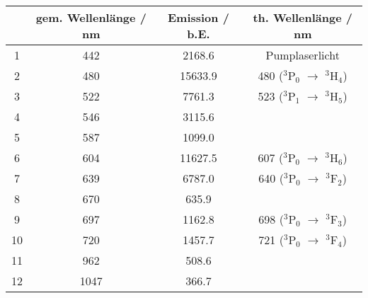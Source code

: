 \begin{center}
\begin{tabular}{|c|c|c|c|}
\hline
 & gem. Wellenlänge / nm & Emission / b.E. & th. Wellenlänge / nm \cite{Versuchsanleitung} \\ \hline
1 & 442 & 2168.6 & Pumplaserlicht \\ \hline
2 & 480 & 15633.9 & 480 ($^3$P$_0$ $\rightarrow$ $^3$H$_4$) \\ \hline
3 & 522 & 7761.3 & 523 ($^3$P$_1$ $\rightarrow$ $^3$H$_5$) \\ \hline
4 & 546 & 3115.6 &  \\ \hline
5 & 587 & 1099.0 &  \\ \hline
6 & 604 & 11627.5 & 607 ($^3$P$_0$ $\rightarrow$ $^3$H$_6$) \\ \hline
7 & 639 & 6787.0 & 640 ($^3$P$_0$ $\rightarrow$ $^3$F$_2$) \\ \hline
8 & 670 & 635.9 &  \\ \hline
9 & 697 & 1162.8 & 698 ($^3$P$_0$ $\rightarrow$ $^3$F$_3$) \\ \hline
10 & 720 & 1457.7 & 721 ($^3$P$_0$ $\rightarrow$ $^3$F$_4$) \\ \hline
11 & 962 & 508.6 &  \\ \hline
12 & 1047 & 366.7 &  \\ \hline
\end{tabular}
\end{center}